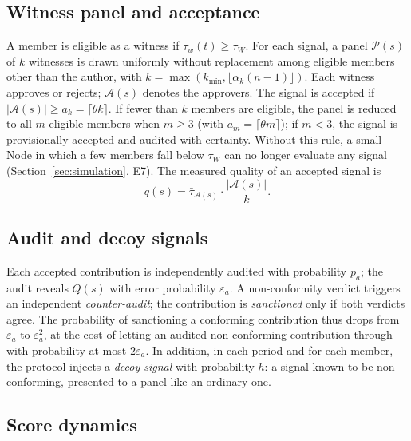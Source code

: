 \documentclass[11pt,a4paper]{article}
\theoremstyle{plain}
\theoremstyle{definition}
\theoremstyle{remark}
\newcommand{\1}{\mathbf{1}}
\begin{document}
\subsection{Witness panel and acceptance}

A member is eligible as a witness if $\tau_w(t)\ge\tau_W$. For each signal, a
panel $\mathcal{P}(s)$ of $k$ witnesses is drawn uniformly without replacement
among eligible members other than the author, with
$k=\max(k_{\min},\lfloor\alpha_k(n-1)\rfloor)$. Each witness approves or
rejects; $\mathcal{A}(s)$ denotes the approvers. The signal is accepted if
$|\mathcal{A}(s)|\ge a_k=\lceil\theta k\rceil$. If fewer than $k$ members are
eligible, the panel is reduced to all $m$ eligible members when $m\ge3$ (with
$a_m=\lceil\theta m\rceil$); if $m<3$, the signal is provisionally accepted and
audited with certainty. Without this rule, a small Node in which a few members
fall below $\tau_W$ can no longer evaluate any signal
(Section~\ref{sec:simulation}, E7). The measured quality of an accepted signal
is
\begin{equation}
q(s)=\bar\tau_{\mathcal{A}(s)}\cdot\frac{|\mathcal{A}(s)|}{k}.
\label{eq:q}
\end{equation}

\subsection{Audit and decoy signals}

Each accepted contribution is independently audited with probability $p_a$; the
audit reveals $Q(s)$ with error probability $\varepsilon_a$. A non-conformity
verdict triggers an independent \emph{counter-audit}; the contribution is
\emph{sanctioned} only if both verdicts agree. The probability of sanctioning a
conforming contribution thus drops from $\varepsilon_a$ to $\varepsilon_a^2$,
at the cost of letting an audited non-conforming contribution through with
probability at most $2\varepsilon_a$. In addition, in each period and for each
member, the protocol injects a \emph{decoy signal} with probability $h$: a
signal known to be non-conforming, presented to a panel like an ordinary one.

\subsection{Score dynamics}
\end{document}
